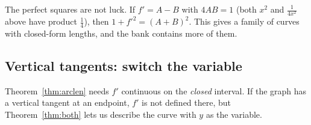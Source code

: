 \documentclass[11pt]{article}
\begin{document}
The perfect squares are not luck. If $f'=A-B$ with $4AB=1$ (both $x^2$ and $\frac1{4x^2}$ above have product $\frac14$), then $1+f'^2=(A+B)^2$. This gives a family of curves with closed-form lengths, and the bank contains more of them.

\subsection*{Vertical tangents: switch the variable}

Theorem~\ref{thm:arclen} needs $f'$ continuous on the \emph{closed} interval. If the graph has a vertical tangent at an endpoint, $f'$ is not defined there, but Theorem~\ref{thm:both} lets us describe the curve with $y$ as the variable.
\end{document}
